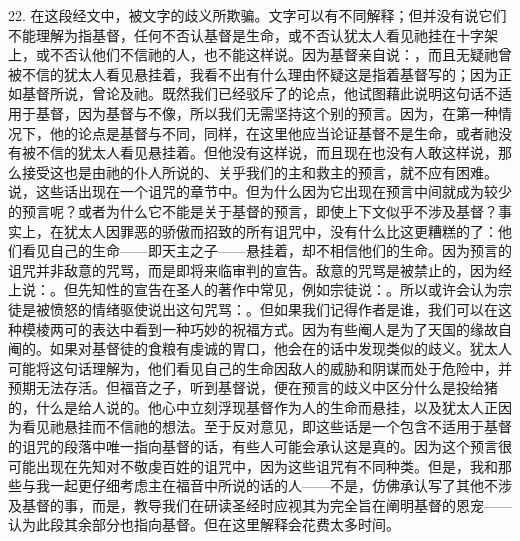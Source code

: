 22. 在这段经文中，被文字的歧义所欺骗。文字可以有不同解释；但并没有说它们不能理解为指基督，任何不否认基督是生命，或不否认犹太人看见祂挂在十字架上，或不否认他们不信祂的人，也不能这样说。因为基督亲自说：，而且无疑祂曾被不信的犹太人看见悬挂着，我看不出有什么理由怀疑这是指着基督写的；因为正如基督所说，曾论及祂。既然我们已经驳斥了的论点，他试图藉此说明这句话不适用于基督，因为基督与不像，所以我们无需坚持这个别的预言。因为，在第一种情况下，他的论点是基督与不同，同样，在这里他应当论证基督不是生命，或者祂没有被不信的犹太人看见悬挂着。但他没有这样说，而且现在也没有人敢这样说，那么接受这也是由祂的仆人所说的、关乎我们的主和救主的预言，就不应有困难。说，这些话出现在一个诅咒的章节中。但为什么因为它出现在预言中间就成为较少的预言呢？或者为什么它不能是关于基督的预言，即使上下文似乎不涉及基督？事实上，在犹太人因罪恶的骄傲而招致的所有诅咒中，没有什么比这更糟糕的了：他们看见自己的生命——即天主之子——悬挂着，却不相信他们的生命。因为预言的诅咒并非敌意的咒骂，而是即将来临审判的宣告。敌意的咒骂是被禁止的，因为经上说：。但先知性的宣告在圣人的著作中常见，例如宗徒说：。所以或许会认为宗徒是被愤怒的情绪驱使说出这句咒骂：。但如果我们记得作者是谁，我们可以在这种模棱两可的表达中看到一种巧妙的祝福方式。因为有些阉人是为了天国的缘故自阉的。如果对基督徒的食粮有虔诚的胃口，他会在的话中发现类似的歧义。犹太人可能将这句话理解为，他们看见自己的生命因敌人的威胁和阴谋而处于危险中，并预期无法存活。但福音之子，听到基督说，便在预言的歧义中区分什么是投给猪的，什么是给人说的。他心中立刻浮现基督作为人的生命而悬挂，以及犹太人正因为看见祂悬挂而不信祂的想法。至于反对意见，即这些话是一个包含不适用于基督的诅咒的段落中唯一指向基督的话，有些人可能会承认这是真的。因为这个预言很可能出现在先知对不敬虔百姓的诅咒中，因为这些诅咒有不同种类。但是，我和那些与我一起更仔细考虑主在福音中所说的话的人——不是，仿佛承认写了其他不涉及基督的事，而是，教导我们在研读圣经时应视其为完全旨在阐明基督的恩宠——认为此段其余部分也指向基督。但在这里解释会花费太多时间。\par

